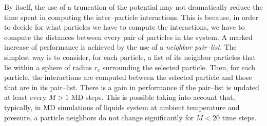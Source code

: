By itself, the use of a truncation of the potential may not dramatically reduce the time spent in computing the 
inter--particle interactions. This is because, in order to decide for what particles we have to compute the 
interactions, we have to compute the distances between every pair of particles in the system. A marked increase 
of performance is achieved by the use of a \textit{neighbor pair--list}. The simplest way is to consider, for 
each particle, a list of its neighbor particles that lie within a sphere of radius $r_c$ surrounding the selected 
particle. Then, for each particle, the interactions are computed between the selected particle and those that are 
in its pair--list. There is a gain in performance if the pair--list is updated at least every $M>1$ \ac{MD} 
steps. This is possible taking into account that, typically, in \ac{MD} simulations of liquids system at ambient 
temperature and pressure, a particle neighbors do not change significantly for $M < 20$ time steps.

